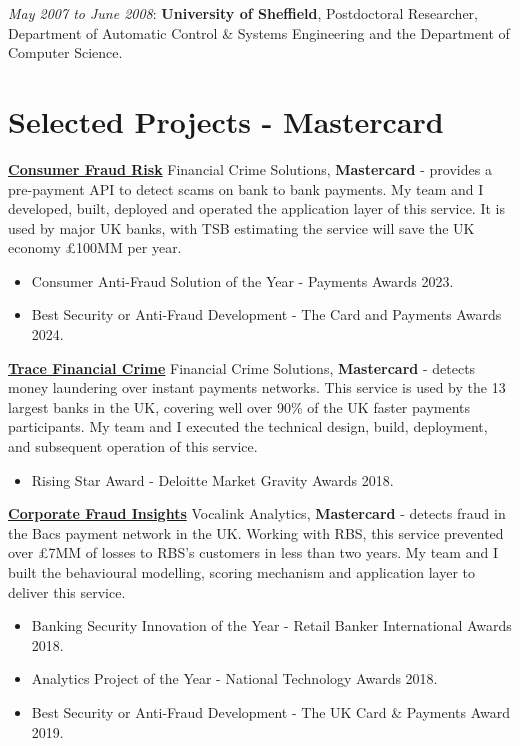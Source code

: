 \documentclass[line, overlapped]{res}
\providecommand{\tightlist}{%
  \setlength{\itemsep}{0pt}\setlength{\parskip}{0pt}}
\begin{document}
\begin{resume}
  \emph{May 2007 to June 2008}: \textbf{University of Sheffield},
  Postdoctoral Researcher, Department of Automatic Control \& Systems
  Engineering and the Department of Computer Science.

\section{Selected Projects - Mastercard}

	\href{https://www.bloomberg.com/news/articles/2023-07-05/mastercard-s-ai-tool-helps-nine-british-banks-tackle-scams}{\textbf{Consumer Fraud Risk}} Financial Crime Solutions, \textbf{Mastercard} - provides a pre-payment API to detect scams on bank to bank payments. My team and I developed, built, deployed and operated the application layer of this service. It is used by major UK banks, with TSB estimating the service will save the UK economy £100MM per year.
  \begin{itemize}
  \tightlist
  \item
    Consumer Anti-Fraud Solution of the Year - Payments Awards 2023.
  \item
    Best Security or Anti-Fraud Development - The Card and Payments Awards 2024.
  \end{itemize}
	\href{https://www.vocalink.com/news-insights/case-studies/case-study-mits/}{\textbf{Trace Financial Crime}} Financial Crime Solutions, \textbf{Mastercard} - detects money laundering over instant payments networks. This service is used by the 13 largest banks in the UK, covering well over 90\% of the UK faster payments participants. My team and I executed the technical design, build, deployment, and subsequent operation of this service.

  \begin{itemize}
  \tightlist
  \item
    Rising Star Award - Deloitte Market Gravity Awards 2018.
  \end{itemize}
	\href{https://www.thetimes.co.uk/article/rbs-system-pushes-back-against-invoice-fraudsters-88h92l5ml}{\textbf{Corporate Fraud Insights}} Vocalink Analytics, \textbf{Mastercard} - detects fraud in the Bacs payment network in the UK. Working with RBS, this service prevented over £7MM of losses to RBS’s customers in less than two years. My team and I built the behavioural modelling, scoring mechanism and application layer to deliver this service. 

  \begin{itemize}
  \tightlist
  \item
    Banking Security Innovation of the Year - Retail Banker International Awards 2018.
  \item
    Analytics Project of the Year - National Technology Awards 2018.
  \item
    Best Security or Anti-Fraud Development - The UK Card \& Payments Award 2019.
  \end{itemize}

\end{resume}
\end{document}
